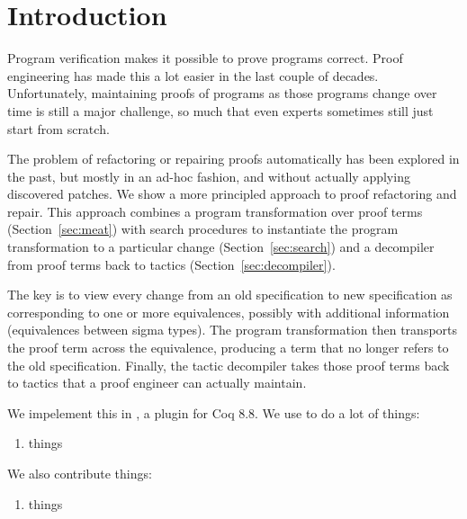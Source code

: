 \section{Introduction}

Program verification makes it possible to prove programs correct.
Proof engineering has made this a lot easier in the last couple of decades.
Unfortunately, maintaining proofs of programs as those programs change over
time is still a major challenge,
so much that even experts sometimes still just start from scratch.

The problem of refactoring or repairing proofs automatically has been explored in the past,
but mostly in an ad-hoc fashion, and without actually applying discovered patches.
We show a more principled approach to proof refactoring and repair. %
This approach combines a program transformation over proof terms (Section~\ref{sec:meat})
with search procedures to instantiate the program transformation to a particular change (Section~\ref{sec:search})
and a decompiler from proof terms back to tactics (Section~\ref{sec:decompiler}).

The key is to view every change from an old specification to new specification as corresponding to one or more equivalences,
possibly with additional information (equivalences between sigma types).
The program transformation then transports the proof term across the equivalence,
producing a term that no longer refers to the old specification.
Finally, the tactic decompiler takes those proof terms back to tactics that a proof engineer
can actually maintain.

We impelement this in \toolname, a plugin for Coq 8.8. We use \toolname to do a lot of things:

\begin{enumerate}
  \item things
\end{enumerate}

We also contribute things:

\begin{enumerate}
\item things
\end{enumerate}
